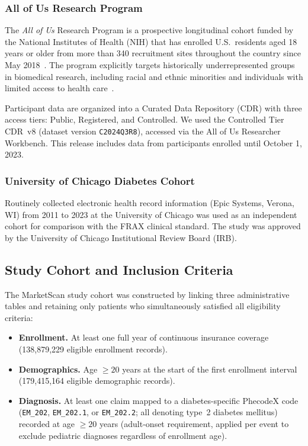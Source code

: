 \documentclass[12pt]{article}
\begin{document}
\subsubsection{All of Us Research Program}

The \textit{All of Us} Research Program is a prospective longitudinal cohort funded by the National Institutes of Health (NIH) that has enrolled U.S.\ residents aged 18 years or older from more than 340 recruitment sites throughout the country since May 2018~\citep{AllofUs2019NEJM}. The program explicitly targets historically underrepresented groups in biomedical research, including racial and ethnic minorities and individuals with limited access to health care~\citep{Ramirez2022AllofUs}.

Participant data are organized into a Curated Data Repository (CDR) with three access tiers: Public, Registered, and Controlled. We used the Controlled Tier CDR~v8 (dataset version \texttt{C2024Q3R8}), accessed via the All of Us Researcher Workbench. This release includes data from participants enrolled until October 1, 2023.

\subsubsection{University of Chicago Diabetes Cohort}

Routinely collected electronic health record information (Epic Systems, Verona, WI) from 2011 to 2023 at the University of Chicago was used as an independent cohort for comparison with the FRAX clinical standard. The study was approved by the University of Chicago Institutional Review Board (IRB).

\subsection{Study Cohort and Inclusion Criteria}

The MarketScan study cohort was constructed by linking three administrative tables and retaining only patients who simultaneously satisfied all eligibility criteria:

\begin{itemize}
\item \textbf{Enrollment.} At least one full year of continuous insurance coverage (138{,}879{,}229 eligible enrollment records).
\item \textbf{Demographics.} Age $\geq 20$ years at the start of the first enrollment interval (179{,}415{,}164 eligible demographic records).
\item \textbf{Diagnosis.} At least one claim mapped to a diabetes-specific PhecodeX code~\citep{Shuey2023PhecodeX} (\texttt{EM\_202}, \texttt{EM\_202.1}, or \texttt{EM\_202.2}; all denoting type~2 diabetes mellitus) recorded at age $\geq 20$ years (adult-onset requirement, applied per event to exclude pediatric diagnoses regardless of enrollment age).
\end{itemize}
\end{document}
